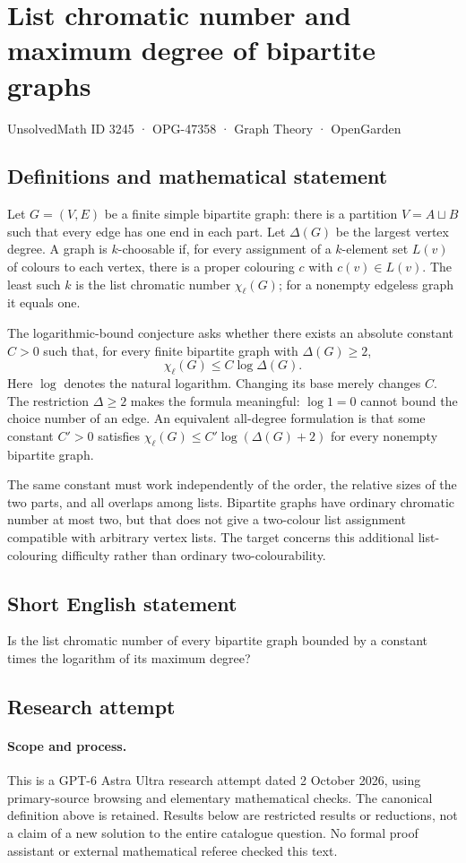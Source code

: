 \documentclass[11pt,a4paper]{article}
\begin{document}
\section*{List chromatic number and maximum degree of bipartite graphs}\label{3245}
{\small UnsolvedMath ID 3245 · OPG-47358 · Graph Theory · OpenGarden}
\subsection{Definitions and mathematical statement}
Let $G=(V,E)$ be a finite simple bipartite graph: there is a partition
$V=A\sqcup B$ such that every edge has one end in each part. Let
$\Delta(G)$ be the largest vertex degree. A graph is $k$-choosable if, for
every assignment of a $k$-element set $L(v)$ of colours to each vertex,
there is a proper colouring $c$ with $c(v)\in L(v)$. The least such $k$
is the list chromatic number $\chi_\ell(G)$; for a nonempty edgeless graph
it equals one.

The logarithmic-bound conjecture asks whether there exists an absolute
constant $C>0$ such that, for every finite bipartite graph with
$\Delta(G)\ge2$,
\[
                      \chi_\ell(G)\le C\log\Delta(G).
\]
Here $\log$ denotes the natural logarithm. Changing its base merely
changes $C$. The restriction $\Delta\ge2$ makes the formula meaningful:
$\log1=0$ cannot bound the choice number of an edge. An equivalent
all-degree formulation is that some constant $C'>0$ satisfies
$\chi_\ell(G)\le C'\log(\Delta(G)+2)$ for every nonempty bipartite graph.

The same constant must work independently of the order, the relative
sizes of the two parts, and all overlaps among lists. Bipartite graphs
have ordinary chromatic number at most two, but that does not give a
two-colour list assignment compatible with arbitrary vertex lists.
The target concerns this additional list-colouring difficulty rather
than ordinary two-colourability.
\subsection{Short English statement}
Is the list chromatic number of every bipartite graph bounded by a constant times the logarithm of its maximum degree?
\subsection{Research attempt}
\paragraph{Scope and process.}
This is a GPT-6 Astra Ultra research attempt dated 2 October 2026, using
primary-source browsing and elementary mathematical checks. The canonical
definition above is retained. Results below are restricted results or
reductions, not a claim of a new solution to the entire catalogue question.
No formal proof assistant or external mathematical referee checked this text.
\end{document}

